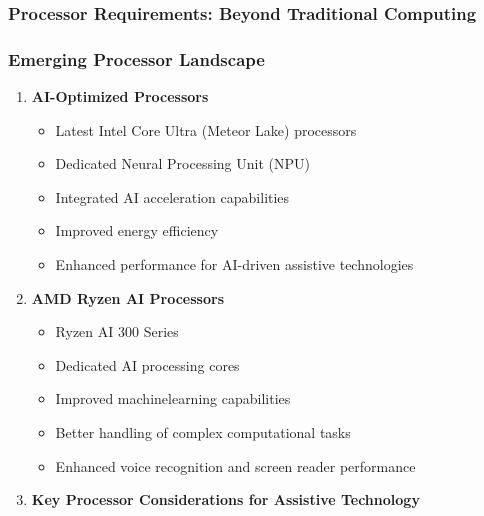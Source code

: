 \subsubsection{Processor Requirements: Beyond Traditional Computing}

\subsubsection{Emerging Processor Landscape}

\begin{enumerate}

	\item \textbf{AI-Optimized Processors}

	      \begin{itemize}
		      \item Latest Intel Core Ultra (Meteor Lake) processors \supercite{IntelMeteorLake}
		      \item Dedicated Neural Processing Unit (NPU) \supercite{IntelNPU}
		      \item Integrated \gls{AI} acceleration capabilities \supercite{IntelAIAcceleration}
		      \item Improved energy efficiency \supercite{IntelPowerEfficiency}
		      \item Enhanced performance for AI-driven assistive technologies \supercite{AIinAccessibility}
	      \end{itemize}

	\item \textbf{AMD Ryzen AI Processors}

	      \begin{itemize}
		      \item Ryzen AI 300 Series \supercite{AMDRyzenAI300}
		      \item Dedicated AI processing cores \supercite{AMDAIProcessing}
		      \item Improved \gls{machinelearning} capabilities \supercite{AMDMachineLearning}
		      \item Better handling of complex computational tasks \supercite{AMDRyzenPerformance}
		      \item Enhanced voice recognition and screen reader performance \supercite{AIinAccessibility}
	      \end{itemize}

	\item \textbf{Key Processor Considerations for Assistive Technology}


\end{enumerate}
